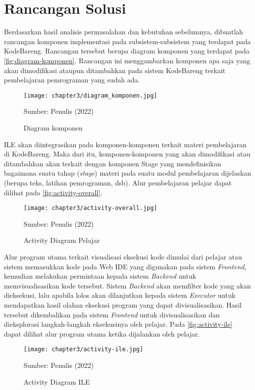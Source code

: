 \section{Rancangan Solusi}

Berdasarkan hasil analisis permasalahan dan kebutuhan sebelumnya, dibuatlah rancangan komponen implementasi pada subsistem-subsistem yang terdapat pada KodeBareng. Rancangan tersebut berupa diagram komponen yang terdapat pada \autoref{fig:diagram-komponen}. Rancangan ini menggambarkan komponen apa saja yang akan dimodifikasi ataupun ditambahkan pada sistem KodeBareng terkait pembelajaran pemrograman yang sudah ada.

\begin{figure}[H]
  \centering
  \texttt{[image: chapter3/diagram\_komponen.jpg]}
  \caption{Diagram komponen} \label{fig:diagram-komponen}
  Sumber: Penulis (2022)
\end{figure}

ILE akan diintegrasikan pada komponen-komponen terkait materi pembelajaran di KodeBareng. Maka dari itu, komponen-komponen yang akan dimodifikasi atau ditambahkan akan terkait dengan komponen Stage yang mendefinisikan bagaimana suatu tahap (\textit{stage}) materi pada suatu modul pembelajaran dijelaskan (berupa teks, latihan pemrograman, dsb). Alur pembelajaran pelajar dapat dilihat pada \autoref{fig:activity-overall}.

\begin{figure}[H]
  \centering
  \texttt{[image: chapter3/activity-overall.jpg]}
  \caption{Activity Diagram Pelajar} \label{fig:activity-overall}
  Sumber: Penulis (2022)
\end{figure}

Alur program utama terkait visualisasi eksekusi kode dimulai dari pelajar atau sistem memasukkan kode pada Web IDE yang digunakan pada sistem \textit{Frontend}, kemudian melakukan permintaan kepada sistem \textit{Backend} untuk memvisualisasikan kode tersebut. Sistem \textit{Backend} akan memfilter kode yang akan dieksekusi, lalu apabila lolos akan dilanjutkan kepada sistem \textit{Executor} untuk mendapatkan hasil olahan eksekusi program yang dapat divisualisasikan. Hasil tersebut dikembalikan pada sistem \textit{Frontend} untuk divisualisasikan dan dieksplorasi langkah-langkah eksekusinya oleh pelajar. Pada \autoref{fig:activity-ile} dapat dilihat alur program utama ketika dijalankan oleh pelajar.

\begin{figure}[!h]
  \centering
  \texttt{[image: chapter3/activity-ile.jpg]}
  \caption{Activity Diagram ILE} \label{fig:activity-ile}
  Sumber: Penulis (2022)
\end{figure}


